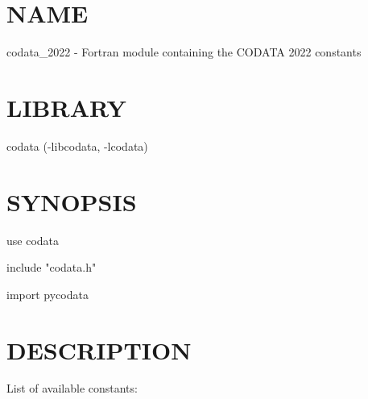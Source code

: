 \section*{NAME}
codata\_2022 - Fortran module containing the CODATA 2022 constants

\section*{LIBRARY}
codata (-libcodata, -lcodata)

\section*{SYNOPSIS}
{\ttfamily
use codata

include "codata.h"

import pycodata

}
\section*{DESCRIPTION}
List of available constants:

